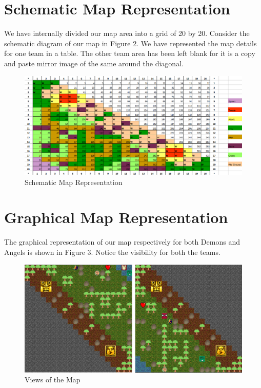 \documentclass[a4paper]{article}
\begin{document}
\section{Schematic Map Representation}
We have internally divided our map area into a grid of 20 by 20. Consider the schematic diagram of our map in Figure 2. We have represented the map details for one team in a table. The other team area has been left blank for it is a copy and paste mirror image of the same around the diagonal.

\begin{figure}[htp]
\centering
\includegraphics[width=1.1\textwidth]{Map_excel.png}
\caption{\label{fig:schematic}Schematic Map Representation}
\end{figure}


\section{Graphical Map Representation}
The graphical representation of our map respectively for both Demons and Angels is shown in Figure 3. Notice the visibility for both the teams. 

\begin{figure}[htp]
\centering
\includegraphics[width=1.0\textwidth]{Map_Views.png}
\caption{\label{fig:angels}Views of the Map}
\end{figure}
\end{document}
